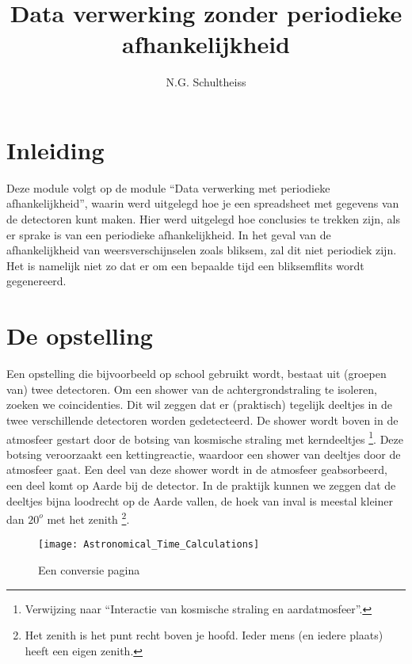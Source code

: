 



\title{Data verwerking zonder periodieke afhankelijkheid}
\author{N.G. Schultheiss}
\date{}

\maketitle
\thispagestyle{firststyle}

\section{Inleiding}

Deze module volgt op de module ``Data verwerking met periodieke
afhankelijkheid'', waarin werd uitgelegd hoe je een spreadsheet met
gegevens van de detectoren kunt maken. Hier werd uitgelegd hoe
conclusies te trekken zijn, als er sprake is van een periodieke
afhankelijkheid. In het geval van de afhankelijkheid van
weersverschijnselen zoals bliksem, zal dit niet periodiek zijn. Het is
namelijk niet zo dat er om een bepaalde tijd een bliksemflits wordt
gegenereerd.


\section{De opstelling}

Een opstelling die bijvoorbeeld op school gebruikt wordt, bestaat uit
(groepen van) twee detectoren. Om een shower van de achtergrondstraling
te isoleren, zoeken we coincidenties. Dit wil zeggen dat er (praktisch)
tegelijk deeltjes in de twee verschillende detectoren worden
gedetecteerd. De shower wordt boven in de atmosfeer gestart door de
botsing van kosmische straling met kerndeeltjes \footnote{Verwijzing
naar {}``Interactie van kosmische straling en aardatmosfeer''.}. Deze
botsing veroorzaakt een kettingreactie, waardoor een shower van deeltjes
door de atmosfeer gaat. Een deel van deze shower wordt in de atmosfeer
geabsorbeerd, een deel komt op Aarde bij de detector. In de praktijk
kunnen we zeggen dat de deeltjes bijna loodrecht op de Aarde vallen, de
hoek van inval is meestal kleiner dan $20^{o}$ met het zenith
\footnote{Het zenith is het punt recht boven je hoofd. Ieder mens (en
iedere plaats) heeft een eigen zenith.}.

\begin{figure}[h]
\centering

\texttt{[image: Astronomical\_Time\_Calculations]}

\caption{Een conversie pagina}
\end{figure}


